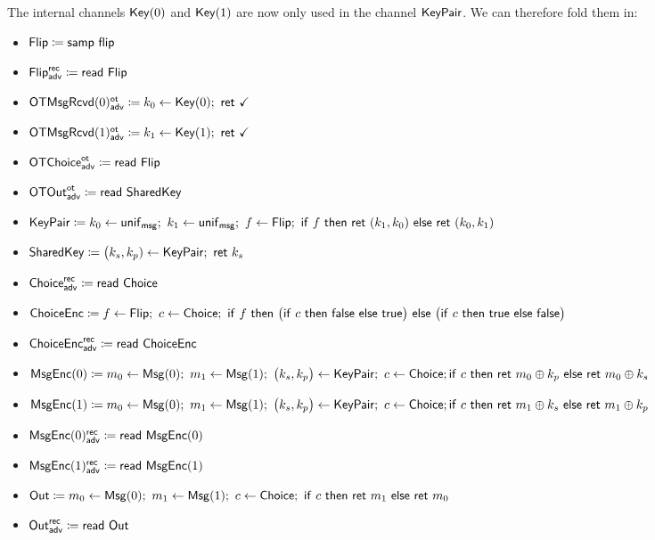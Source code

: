 \noindent The internal channels $\mathsf{Key}(0)$ and $\mathsf{Key}(1)$ are now only used in the channel $\mathsf{KeyPair}$. We can therefore fold them in:

\begin{itemize}
\item $\mathsf{Flip} \coloneqq \mathsf{samp} \ \mathsf{flip}$
\item {\color{blue} $\mathsf{Flip}^{\mathsf{rec}}_{\mathsf{adv}} \coloneqq \mathsf{read} \ \mathsf{Flip}$}
\item {\color{blue} $\LeakOTMsgRcvd(0)^\ot_\adv \coloneqq k_0 \leftarrow \Key(0); \ \ret{\checkmark}$}
\item {\color{blue} $\LeakOTMsgRcvd(1)^\ot_\adv \coloneqq k_1 \leftarrow \Key(1); \ \ret{\checkmark}$}
\item {\color{blue} $\mathsf{OTChoice}^{\mathsf{ot}}_{\mathsf{adv}} \coloneqq \mathsf{read} \ \mathsf{Flip}$}
\item {\color{blue} $\mathsf{OTOut}^{\mathsf{ot}}_{\mathsf{adv}} \coloneqq \mathsf{read} \ \mathsf{SharedKey}$}
\item {\color{red} $\KeyPair \coloneqq k_0 \leftarrow \unif_\msg; \ k_1 \leftarrow \unif_\msg; \ f \leftarrow \Flip; \ \ifte{f}{\ret{(k_1,k_0)}}{\ret{(k_0,k_1)}}$}
\item $\mathsf{SharedKey} \coloneqq \big(k_s,k_p) \leftarrow \mathsf{KeyPair}; \ \mathsf{ret} \ k_s$
\item {\color{blue} $\mathsf{Choice}^{\mathsf{rec}}_{\mathsf{adv}} \coloneqq \mathsf{read} \ \mathsf{Choice}$}
\item $\ChoiceEnc \coloneqq f \leftarrow \Flip; \ c \leftarrow \Choice; \ \ifte{f}{\big(\ifte{c}{\false}{\true}\big)}{\big(\ifte{c}{\true}{\false}\big)}$
\item {\color{blue} $\mathsf{ChoiceEnc}^{\mathsf{rec}}_{\mathsf{adv}} \coloneqq \mathsf{read} \ \mathsf{ChoiceEnc}$}
\item $\mathsf{MsgEnc}(0) \coloneqq m_0 \leftarrow \mathsf{Msg}(0); \ m_1 \leftarrow \mathsf{Msg}(1); \ \big(k_s,k_p\big) \leftarrow \mathsf{KeyPair}; \ c \leftarrow \mathsf{Choice}; \\ \mathsf{if} \ c \ \mathsf{then} \ \mathsf{ret} \ m_0 \oplus k_p \ \mathsf{else} \ \mathsf{ret} \ m_0 \oplus k_s$
\item $\mathsf{MsgEnc}(1) \coloneqq m_0 \leftarrow \mathsf{Msg}(0); \ m_1 \leftarrow \mathsf{Msg}(1); \ \big(k_s,k_p\big) \leftarrow \mathsf{KeyPair}; \ c \leftarrow \mathsf{Choice}; \\ \mathsf{if} \ c \ \mathsf{then} \ \mathsf{ret} \ m_1 \oplus k_s \ \mathsf{else} \ \mathsf{ret} \ m_1 \oplus k_p$
\item {\color{blue} $\mathsf{MsgEnc}(0)^{\mathsf{rec}}_{\mathsf{adv}} \coloneqq \mathsf{read} \ \mathsf{MsgEnc}(0)$}
\item {\color{blue} $\mathsf{MsgEnc}(1)^{\mathsf{rec}}_{\mathsf{adv}} \coloneqq \mathsf{read} \ \mathsf{MsgEnc}(1)$}
\item $\Out \coloneqq m_0 \leftarrow \Msg(0); \ m_1 \leftarrow \Msg(1); \ c \leftarrow \Choice; \ \ifte{c}{\ret{m_1}}{\ret{m_0}}$
\item {\color{blue} $\mathsf{Out}^{\mathsf{rec}}_{\mathsf{adv}} \coloneqq \mathsf{read} \ \mathsf{Out}$}
\end{itemize}

